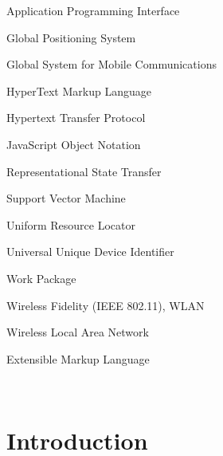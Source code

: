 \documentclass[external]{20120615_deliverable_template_ukob}
\theoremstyle{definition}
\begin{document}
\begin{LGAbbreviations}

{Application Programming Interface}

{Global Positioning System}

{Global System for Mobile Communications}

{HyperText Markup Language}

{Hypertext Transfer Protocol}

{JavaScript Object Notation}

{Representational State Transfer}

{Support Vector Machine}

{Uniform Resource Locator}

{Universal Unique Device Identifier}

{Work Package}

{Wireless Fidelity (IEEE 802.11), WLAN}

{Wireless Local Area Network}

{Extensible Markup Language}

\LGaddabbreviation{~\\}
{~~~}

\end{LGAbbreviations}


\setcounter{tocdepth}{1}

\LGTOC

\newpage

\chapter{Introduction}
\label{chap:Introduction}
\end{document}
